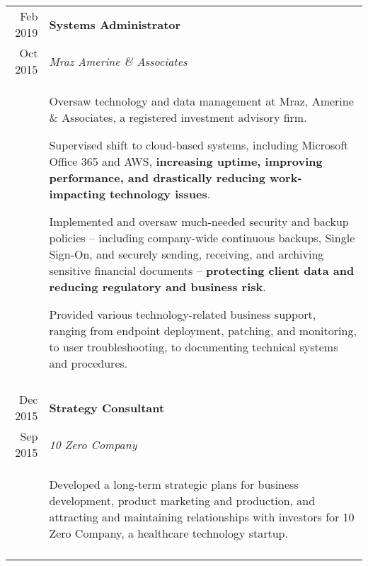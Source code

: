 \documentclass[10pt]{article}
\newcommand{\afterlistspace}[0]{\vspace{-1.5em}}
\begin{document}
\begin{tabular}{r|p{16cm}}
    Feb 2019 & \textbf{Systems Administrator}
    \\
    Oct 2015 & \emph{Mraz Amerine \& Associates}
    \\
    & \begin{itemize}
        \footnotesize{
            \item Oversaw technology and data management at Mraz, Amerine \& Associates, a registered investment advisory firm.
            
            \item Supervised shift to cloud-based systems, including Microsoft Office 365 and AWS, \textbf{increasing uptime, improving performance, and drastically reducing work-impacting technology issues}.
            
            \item Implemented and oversaw much-needed security and backup policies -- including company-wide continuous backups, Single Sign-On, and securely sending, receiving, and archiving sensitive financial documents -- \textbf{protecting client data and reducing regulatory and business risk}.

            \item Provided various technology-related business support, ranging from endpoint deployment, patching, and monitoring, to user troubleshooting, to documenting technical systems and procedures.
        }
        \afterlistspace
    \end{itemize}
    
    \\
    \multicolumn{2}{c}{}
    \\
    
    Dec 2015 & \textbf{Strategy Consultant}
    \\
    Sep 2015 & \emph{10 Zero Company}
    \\
    & \begin{itemize}
        \footnotesize{
            \item Developed a long-term strategic plans for business development, product marketing and production, and attracting and maintaining relationships with investors for 10 Zero Company, a healthcare technology startup.
        }
        \afterlistspace
    \end{itemize}

    \\
    \multicolumn{2}{c}{}
    \\


\end{tabular}
\end{document}
